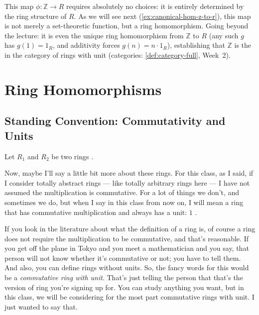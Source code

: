 \begin{content}
\begin{steps}
This map $\phi \colon \mathbb{Z} \to R$ requires absolutely no choices: it is entirely determined by the ring structure of $R$. As we will see next (\cref{ex:canonical-hom-z-to-r}), this map is not merely a set-theoretic function, but a ring homomorphism. Going beyond the lecture: it is even the unique ring homomorphism from $\mathbb{Z}$ to $R$ (any such $g$ has $g(1) = 1_R$, and additivity forces $g(n) = n \cdot 1_R$), establishing that $\mathbb{Z}$ is the  in the category of rings with unit (categories: \cref{def:category-full}, Week~2).
\end{steps}
\end{content}

\begin{hidden}
\end{hidden}

\section{Ring Homomorphisms}
\subsection{Standing Convention: Commutativity and Units}

\begin{speech}[00:17:10 - 00:18:44]
Let $R_1$ and $R_2$ be two rings .

Now, maybe I'll say a little bit more about these rings. For this class, as I said, if I consider totally abstract rings --- like totally arbitrary rings here  --- I have not assumed the multiplication is commutative. For a lot of things we don't, and sometimes we do, but when I say  in this class from now on, I will mean a ring that has commutative multiplication  and always has a unit: $1$ .

If you look in the literature about what the definition of a ring is, of course a ring does not require the multiplication to be commutative, and that's reasonable. If you get off the plane in Tokyo and you meet a mathematician and you say,  that person will not know whether it's commutative or not; you have to tell them. And also, you can define rings without units. So, the fancy words for this would be a \emph{commutative ring with unit}. That's just telling the person that that's the version of ring you're signing up for. You can study anything you want, but in this class, we will be considering for the most part commutative rings with unit. I just wanted to say that.
\end{speech}

